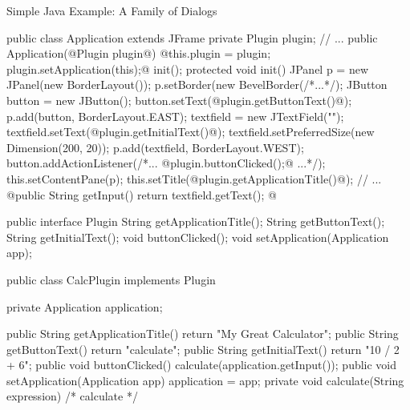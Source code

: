\begin{frame}[fragile]{Simple Java Example: A Family of Dialogs}
	\begin{mycolumns}[columns=2,widths={50,50}]
\tiny
\begin{codetight}{}
public class Application extends JFrame {
	private Plugin plugin;
	// ...
	public Application(@Plugin plugin@) {
		@this.plugin = plugin;
		plugin.setApplication(this);@
		init();
	}
	protected void init() {
		JPanel p = new JPanel(new BorderLayout());
		p.setBorder(new BevelBorder(/*...*/);
		JButton button = new JButton();
		button.setText(@plugin.getButtonText()@);
		p.add(button, BorderLayout.EAST);
		textfield = new JTextField("");
		textfield.setText(@plugin.getInitialText()@);
		textfield.setPreferredSize(new Dimension(200, 20));
		p.add(textfield, BorderLayout.WEST);		
		button.addActionListener(/*... @plugin.buttonClicked();@ ...*/);
		this.setContentPane(p);		
		this.setTitle(@plugin.getApplicationTitle()@);
		// ...
	}
	@public String getInput() {
		return textfield.getText();
	}@
}
\end{codetight}
		\mynextcolumn
{\tiny
\begin{codetight}{}
public interface Plugin {
	String getApplicationTitle();
	String getButtonText();
	String getInitialText();
	void buttonClicked();
	void setApplication(Application app);
}
\end{codetight}
\begin{codetight}{}
public class CalcPlugin implements Plugin {
	private Application application;

	public String getApplicationTitle() {
		return "My Great Calculator";
	}
	public String getButtonText() {
		return "calculate";
	}
	public String getInitialText() {
		return "10 / 2 + 6";
	}
	public void buttonClicked() {
		calculate(application.getInput());
	}
	public void setApplication(Application app) {
		application = app;
	}
	private void calculate(String expression) {
		/* calculate */
	}
}
\end{codetight}
}
	\end{mycolumns}
\end{frame}

